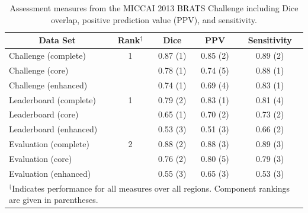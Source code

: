 \documentclass[preprint,authoryear,review,12pt]{elsarticle}
\begin{document}
{%


\begin{table}
\caption{Assessment measures from the MICCAI 2013 BRATS Challenge including
 Dice overlap, positive prediction value (PPV), and sensitivity.}
\label{table:results}
\begin{center}
\begin{tabular*}{0.99\textwidth}{@{\extracolsep{\fill} } l c c c c}
\toprule
\multicolumn{1}{c}{ \bf Data Set} & {\bf Rank}$^\dagger$ & {\bf Dice} & {\bf PPV} & {\bf Sensitivity} \\
\midrule
Challenge (complete) & 1 & 0.87 (1) & 0.85 (2) & 0.89 (2) \\
Challenge (core) & {} & 0.78 (1) & 0.74 (5) & 0.88 (1) \\
Challenge (enhanced) & {} & 0.74 (1) & 0.69 (4) & 0.83 (1) \\
\midrule
Leaderboard (complete) &  1 & 0.79 (2) & 0.83 (1) & 0.81 (4) \\
Leaderboard (core)     & {} & 0.65 (1) & 0.70 (2) & 0.73 (2) \\
Leaderboard (enhanced) & {} & 0.53 (3) & 0.51 (3) & 0.66 (2) \\
\midrule
Evaluation (complete) &  2 & 0.88 (2) & 0.88 (3) & 0.89 (3) \\
Evaluation (core)     & {} & 0.76 (2) & 0.80 (5) & 0.79 (3) \\
Evaluation (enhanced) & {} & 0.55 (3) & 0.65 (3) & 0.53 (3) \\
\bottomrule
\multicolumn{5}{l}{\scriptsize$^\dagger$Indicates performance
for all measures over all regions.  Component rankings are 
given in parentheses.
}
\end{tabular*}
\end{center}
\end{table}


}
\end{document}

